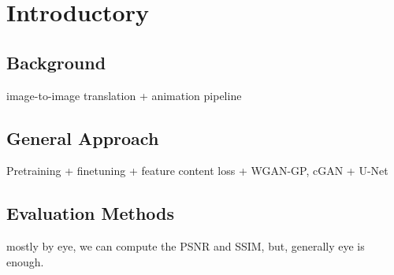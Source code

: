 \chapter{Introductory}
\label{chapterlabel1}
\section{Background}
image-to-image translation + animation pipeline
\section{General Approach}
Pretraining + finetuning + feature content loss + WGAN-GP, cGAN + U-Net
\section{Evaluation Methods}
mostly by eye, we can compute the PSNR and SSIM, but, generally eye is enough.


